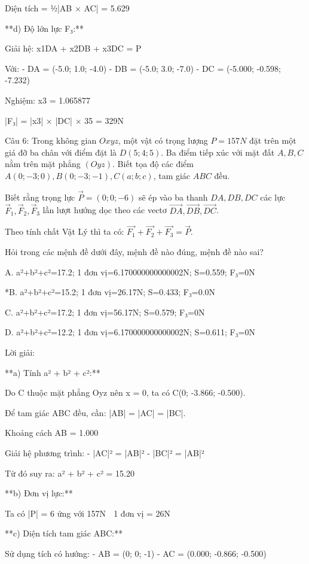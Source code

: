 \documentclass[a4paper,12pt]{article}
\begin{document}
Diện tích = ½|AB⃗ × AC⃗| = 5.629

**d) Độ lớn lực F₃:**

Giải hệ: x1DA⃗ + x2DB⃗ + x3DC⃗ = P⃗

Với:
- DA⃗ = (-5.0; 1.0; -4.0)
- DB⃗ = (-5.0; 3.0; -7.0)
- DC⃗ = (-5.000; -0.598; -7.232)

Nghiệm: x3 = 1.065877

|F₃| = |x3| × |DC⃗| × 35 = 329N




Câu 6: Trong không gian \(Oxyz\), một vật có trọng lượng \(P=157N\) đặt trên một giá đỡ ba chân với điểm đặt là \(D(5; 4; 5)\). Ba điểm tiếp xúc với mặt đất \(A, B, C\) nằm trên mặt phẳng \((Oyz)\). Biết tọa độ các điểm \(A(0; -3; 0), B(0; -3; -1), C(a; b; c)\), tam giác \(ABC\) đều. 

Biết rằng trọng lực \(\overrightarrow{P}=(0; 0; -6)\) sẽ ép vào ba thanh \(DA, DB, DC\) các lực \(\overrightarrow{F}_1, \overrightarrow{F}_2, \overrightarrow{F}_3\) lần lượt hướng dọc theo các vectơ \(\overrightarrow{DA}, \overrightarrow{DB}, \overrightarrow{DC}\). 

Theo tính chất Vật Lý thì ta có: \(\overrightarrow{F_1}+\overrightarrow{F_2}+\overrightarrow{F_3}=\overrightarrow{P}\).

Hỏi trong các mệnh đề dưới đây, mệnh đề nào đúng, mệnh đề nào sai?

A. a²+b²+c²=17.2; 1 đơn vị=6.170000000000002N; S=0.559; F₃=0N

*B. a²+b²+c²=15.2; 1 đơn vị=26.17N; S=0.433; F₃=0.0N

C. a²+b²+c²=17.2; 1 đơn vị=56.17N; S=0.579; F₃=0N

D. a²+b²+c²=12.2; 1 đơn vị=6.170000000000002N; S=0.611; F₃=0N

Lời giải:


**a) Tính a² + b² + c²:**

Do C thuộc mặt phẳng Oyz nên x = 0, ta có C(0; -3.866; -0.500).

Để tam giác ABC đều, cần: |AB| = |AC| = |BC|.

Khoảng cách AB = 1.000

Giải hệ phương trình:
- |AC|² = |AB|²  
- |BC|² = |AB|²

Từ đó suy ra: a² + b² + c² = 15.20

**b) Đơn vị lực:**

Ta có |P⃗| = 6 ứng với 157N
⟹ 1 đơn vị = 26N

**c) Diện tích tam giác ABC:**

Sử dụng tích có hướng:
- AB⃗ = (0; 0; -1)
- AC⃗ = (0.000; -0.866; -0.500)
\end{document}

